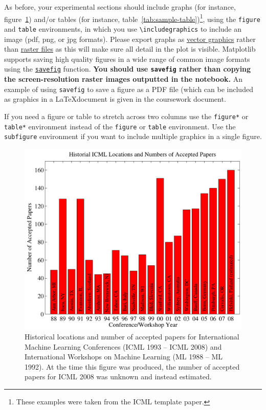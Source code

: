 \documentclass{article}
\begin{document}
As before, your experimental sections should include graphs (for instance, figure~\ref{fig:sample-graph}) and/or tables (for instance, table~\ref{tab:sample-table})\footnote{These examples were taken from the ICML template paper.}, using the \verb+figure+ and \verb+table+ environments, in which you use \verb+\includegraphics+ to include an image (pdf, png, or jpg formats).  Please export graphs as 
\href{https://en.wikipedia.org/wiki/Vector_graphics}{vector graphics}
rather than \href{https://en.wikipedia.org/wiki/Raster_graphics}{raster
files} as this will make sure all detail in the plot is visible.
Matplotlib supports saving high quality figures in a wide range of
common image formats using the
\href{http://matplotlib.org/api/pyplot_api.html\#matplotlib.pyplot.savefig}{\texttt{savefig}}
function. \textbf{You should use \texttt{savefig} rather than copying
the screen-resolution raster images outputted in the notebook.} An
example of using \texttt{savefig} to save a figure as a PDF file (which
can be included as graphics in a \LaTeX document is given in the coursework document.

If you need a figure or table to stretch across two columns use the \verb+figure*+ or \verb+table*+ environment instead of the \verb+figure+ or \verb+table+ environment.  Use the \verb+subfigure+ environment if you want to include multiple graphics in a single figure.

\begin{figure}[tb]
\vskip 5mm
\begin{center}
\centerline{\includegraphics[width=\columnwidth]{icml_numpapers}}
\caption{Historical locations and number of accepted papers for International
  Machine Learning Conferences (ICML 1993 -- ICML 2008) and
  International Workshops on Machine Learning (ML 1988 -- ML
  1992). At the time this figure was produced, the number of
  accepted papers for ICML 2008 was unknown and instead estimated.}
\label{fig:sample-graph}
\end{center}
\vskip -5mm
\end{figure} 
\end{document}
